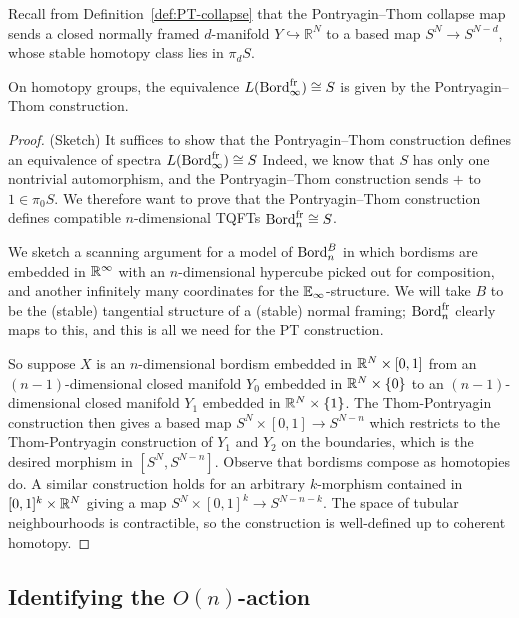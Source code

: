 \documentclass{amsart}
\begin{document}
Recall from Definition~\ref{def:PT-collapse} that the Pontryagin--Thom collapse map sends a closed normally framed $d$-manifold $Y \hookrightarrow \mathbb{R}^N$ to a based map $S^N \to S^{N-d}$, whose stable homotopy class lies in $\pi_d S$.


\begin{theorem}
    On homotopy groups, the equivalence $L(\operatorname{Bord}_\infty^{\mathrm{fr}}) \cong S$ is given by the Pontryagin--Thom construction.
\end{theorem}
\begin{proof}(Sketch)
    It suffices to show that the Pontryagin--Thom construction defines an equivalence of spectra $L(\operatorname{Bord}_\infty^{\mathrm{fr}}) \cong S$
    Indeed, we know that $S$ has only one nontrivial automorphism, and the Pontryagin--Thom construction sends $+$ to $1 \in \pi_0 S$.
     We therefore want to prove that the Pontryagin--Thom construction defines compatible $n$-dimensional TQFTs $\operatorname{Bord}_n^{\mathrm{fr}} \cong S$.
     
     We sketch a scanning argument for a model of $\operatorname{Bord}_n^{B}$ in which bordisms are embedded in $\mathbb{R}^\infty$ with an $n$-dimensional hypercube picked out for composition, and another infinitely many coordinates for the $\mathbb{E}_\infty$-structure.
     We will take $B$ to be the (stable) tangential structure of a (stable) normal framing; $\operatorname{Bord}_n^{\mathrm{fr}}$ clearly maps to this, and this is all we need for the PT construction.
     
     So suppose $X$ is an $n$-dimensional bordism embedded in $\mathbb{R}^N \times [0,1]$ from an $(n-1)$-dimensional closed manifold $Y_0$ embedded in $\mathbb{R}^N \times \{0\}$ to an $(n-1)$-dimensional closed manifold $Y_1$ embedded in $\mathbb{R}^N \times \{1\}$.
     The Thom-Pontryagin construction then gives a based map $S^N\times[0,1]\to S^{N-n}$ which restricts to the Thom-Pontryagin construction of $Y_1$ and $Y_2$ on the boundaries, which is the desired morphism in $[S^N,S^{N-n}]$.
     Observe that bordisms compose as homotopies do.
     A similar construction holds for an arbitrary $k$-morphism contained in $[0,1]^k \times \mathbb{R}^N$ giving a map $S^N\times[0,1]^k\to S^{N-n-k}$.
     The space of tubular neighbourhoods is contractible, so the construction is well-defined up to coherent homotopy.
\end{proof}

\subsection{Identifying the \texorpdfstring{$O(n)$}{O(n)}-action}
\end{document}

